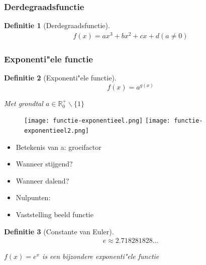 \documentclass{article}
\newtheorem{theorem}{Definitie}[section]
\begin{document}
\subsubsection{Derdegraadsfunctie}

\begin{theorem}[Derdegraadsfunctie]
\begin{equation}
    \begin{aligned}
        f(x) = ax^3 + bx^2 + cx + d
        (a \neq 0)
    \end{aligned}
\end{equation}


\end{theorem}

\subsubsection{Exponenti"ele functie}

\begin{theorem}[Exponenti"ele functie]
\begin{equation}
    f(x) = a^{g(x)}
\end{equation}

Met grondtal $a \in \mathbb{R}_0^+ \backslash \{1\}$
\end{theorem}

\begin{figure}[H]
    \centering
    \texttt{[image: functie-exponentieel.png]}
    \texttt{[image: functie-exponentieel2.png]}
    \caption{}
\end{figure}


\begin{itemize}
    \item Betekenis van a: groeifactor
    \item Wanneer stijgend? 
    \item Wanneer dalend? 
    \item Nulpunten: 
    \item Vaststelling beeld functie
\end{itemize}



\begin{theorem}[Constante van Euler]

\begin{equation}
    \begin{aligned}
        e \approx 2.718281828\dots
    \end{aligned}
\end{equation}

$f(x) = e^x$ is een bijzondere exponenti"ele functie
\end{theorem}
\end{document}
